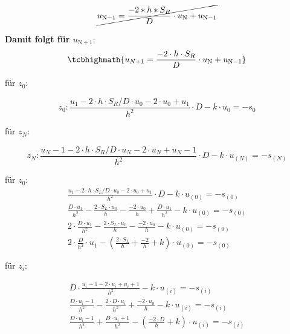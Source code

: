 \begin{equation}
	\cancel{
		u_{\mathrm{N}-1} = \frac{-2*h*S_R}{D} \cdot u_\mathrm{N} + u_{\mathrm{N}-1}
	}
\end{equation}

\begin{qed}
	\textbf{Damit folgt für $u_{\mathrm{N}+1}$}:
	\begin{equation}
	\tcbhighmath{	u_{N+1} = \frac{-2\cdot h\cdot S_R}{D} \cdot u_\mathrm{N} + u_{\mathrm{N}-1}}
	\end{equation}
\end{qed}



für $z_0$:

\begin{equation}
	z_0: \frac{u_1-2\cdot h\cdot S_R/D\cdot u_0-2\cdot u_0+u_1}{h^2} \cdot D-k\cdot u_0 = -s_0
\end{equation}


für $z_N$:

\begin{equation}
	z_N: \frac{u_N-1-2\cdot h\cdot S_R/D\cdot u_N-2\cdot u_N+u_N-1}{h^2}\cdot  D-k\cdot u_(N) = -s_(N)
\end{equation}

für $z_0$:
\begin{equation}
	\begin{split}
		\frac{u_1-2\cdot h\cdot S_L/D\cdot u_0-2\cdot u_0+u_1}{h^2} \cdot D-k\cdot u_(0) = -s_(0)\\
		\frac{D\cdot u_1}{h^2}-\frac{2\cdot S_L\cdot u_0}{h}-\frac{-2\cdot u_0}{h}+\frac{D\cdot u_1}{h^2}-k\cdot u_(0) = -s_(0)\\
		2\cdot \frac{D\cdot u_1}{h^2}-\frac{2\cdot S_L\cdot u_0}{h}-\frac{-2\cdot u_0}{h}-k\cdot u_(0) = -s_(0)\\
		2\cdot \frac{D}{h^2}\cdot u_1-(\frac{2\cdot S_L}{h}+\frac{-2}{h}+k)\cdot u_(0) = -s_(0)
	\end{split}
\end{equation}


für $z_i$:

\begin{equation}
	\begin{split}
		D\cdot \frac{u_i-1-2\cdot u_i+u_i+1}{h^2}-k\cdot u_(i) = -s_(i)\\
		\frac{D\cdot u_i-1}{h^2}-\frac{2\cdot D\cdot u_i}{h^2}+\frac{-2\cdot u_0}{h}-k\cdot u_(i) = -s_(i)\\
		\frac{D\cdot u_i-1}{h^2}+\frac{D\cdot u_i+1}{h^2}-(\frac{-2\cdot D}{h}+k)\cdot u_(i) = -s_(i)\\
	\end{split}
\end{equation}




